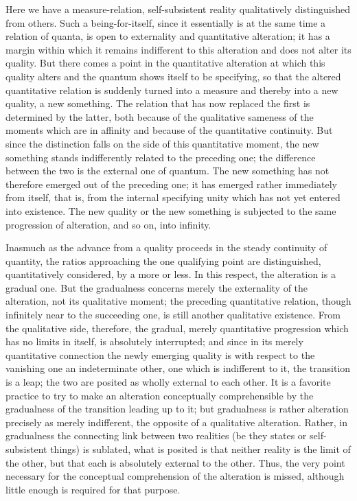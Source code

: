 Here we have a measure-relation,
self-subsistent reality qualitatively distinguished from others.
Such a being-for-itself, since it essentially is
at the same time a relation of quanta,
is open to externality and quantitative alteration;
it has a margin within which it remains indifferent to this
alteration and does not alter its quality.
But there comes a point in the quantitative alteration
at which this quality alters and the quantum shows
itself to be specifying,
so that the altered quantitative relation is
suddenly turned into a measure
and thereby into a new quality,
a new something.
The relation that has now replaced the first
is determined by the latter,
both because of the qualitative sameness
of the moments which are in affinity
and because of the quantitative continuity.
But since the distinction falls on
the side of this quantitative moment,
the new something stands indifferently
related to the preceding one;
the difference between the two is
the external one of quantum.
The new something has not therefore
emerged out of the preceding one;
it has emerged rather immediately from itself, that is,
from the internal specifying unity
which has not yet entered into existence.
The new quality or the new something is
subjected to the same progression of alteration,
and so on, into infinity.

Inasmuch as the advance from a quality proceeds
in the steady continuity of quantity,
the ratios approaching the one qualifying point are distinguished,
quantitatively considered, by a more or less.
In this respect, the alteration is a gradual one.
But the gradualness concerns merely the
externality of the alteration, not its qualitative moment;
the preceding quantitative relation,
though infinitely near to the succeeding one,
is still another qualitative existence.
From the qualitative side, therefore,
the gradual, merely quantitative progression
which has no limits in itself,
is absolutely interrupted;
and since in its merely quantitative connection
the newly emerging quality is with respect to
the vanishing one an indeterminate other,
one which is indifferent to it,
the transition is a leap;
the two are posited as wholly external to each other.
It is a favorite practice to try to make an alteration
conceptually comprehensible by the gradualness of
the transition leading up to it;
but gradualness is rather alteration precisely
as merely indifferent, the opposite of a qualitative alteration.
Rather, in gradualness the connecting link between two realities
(be they states or self-subsistent things)
is sublated, what is posited is that
neither reality is the limit of the other,
but that each is absolutely external to the other.
Thus, the very point necessary for the conceptual comprehension
of the alteration is missed,
although little enough is required for that purpose.

